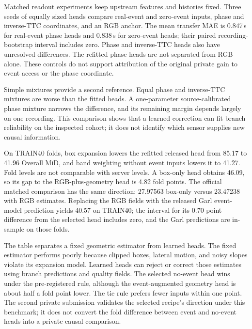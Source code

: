 Matched readout experiments keep upstream features and histories fixed. Three seeds of equally sized heads compare real-event and zero-event inputs, phase and inverse-TTC coordinates, and an RGB anchor. The mean transfer MAE is 0.847\,s for real-event phase heads and 0.838\,s for zero-event heads; their paired recording-bootstrap interval includes zero. Phase and inverse-TTC heads also have unresolved differences. The refitted phase heads are not separated from RGB alone. These controls do not support attribution of the original private gain to event access or the phase coordinate.

\begin{table}[htbp]
\centering\footnotesize

\caption{Equal-capacity readouts on fixed final-model features and histories. Results use development-exposed EvTTC recordings; lower MAE is better.}
\label{tab:short-heads}
\end{table}

Simple mixtures provide a second reference. Equal phase and inverse-TTC mixtures are worse than the fitted heads. A one-parameter source-calibrated phase mixture narrows the difference, and its remaining margin depends largely on one recording. This comparison shows that a learned correction can fit branch reliability on the inspected cohort; it does not identify which sensor supplies new causal information.

On TRAIN40 folds, box expansion lowers the refitted released head from 85.17 to 41.96 Overall MiD, and band weighting without event inputs lowers it to 41.27. Fold levels are not comparable with server levels. A box-only head obtains 46.09, so its gap to the RGB-plus-geometry head is 4.82 fold points. The official matched comparison has the same direction: 27.97563 box-only versus 23.47238 with RGB estimates. Replacing the RGB fields with the released Garl event-model prediction yields 40.57 on TRAIN40; the interval for its 0.70-point difference from the selected head includes zero, and the Garl predictions are in-sample on those folds.

\begin{table}[htbp]
\centering\footnotesize

\caption{Geometry and branch inputs on TRAIN40 development folds. Levels cannot be compared directly with private-test scores.}
\label{tab:short-geometry}
\end{table}

The table separates a fixed geometric estimator from learned heads. The fixed estimator performs poorly because clipped boxes, lateral motion, and noisy slopes violate its expansion model. Learned heads can reject or correct those estimates using branch predictions and quality fields. The selected no-event head wins under the pre-registered rule, although the event-augmented geometry head is about half a fold point lower. The tie rule prefers fewer inputs within one point. The second private submission validates the selected recipe's direction under this benchmark; it does not convert the fold difference between event and no-event heads into a private causal comparison.

